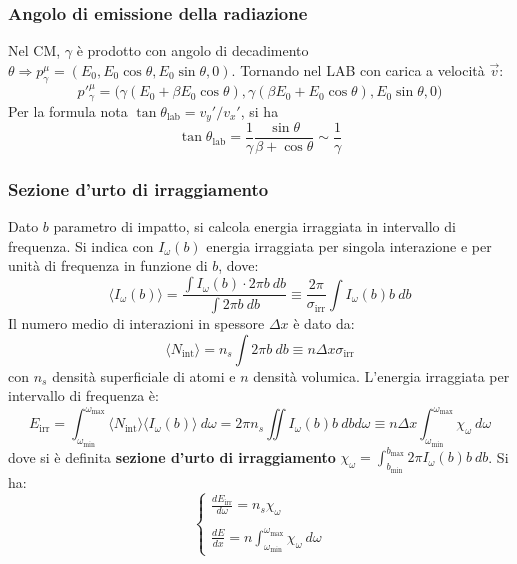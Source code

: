 \documentclass[10pt, a4paper]{scrartcl}
\numberwithin{equation}{subsection}
\theoremstyle{style1}
\begin{document}
\subsubsection{Angolo di emissione della radiazione}
Nel CM, $\gamma$ \`e prodotto con angolo di decadimento $\theta \Rightarrow p^\mu _\gamma = (E_0, E_0 \cos \theta , E_0 \sin \theta ,0)$. Tornando nel LAB con carica a velocit\`a $\vec{v}$: 
\[
 p'^\mu _\gamma = \Big(\gamma(E_0 + \beta E_0\cos\theta ), \gamma (\beta  E_0 + E_0 \cos \theta ), E_0 \sin \theta,0 \Big)
\] 
Per la formula nota $\tan \theta _\text{lab}= v_y' / v_x ' $, si ha
\begin{equation}
	\tan \theta _\text{lab} = \frac{1}{\gamma} \frac{\sin \theta }{\beta  + \cos \theta } \sim \frac{1}{\gamma}
\end{equation}
\subsubsection{Sezione d'urto di irraggiamento}
Dato $b$ parametro di impatto, si calcola energia irraggiata in intervallo di frequenza. Si indica con $I_\omega(b)$ energia irraggiata per singola interazione e per unit\`a di frequenza in funzione di $b$, dove:
\begin{equation}
	\langle I_\omega(b) \rangle = \frac{\displaystyle \int I_\omega(b) \cdot  2\pi  b\ db}{\displaystyle \int 2\pi b \ db}\equiv \frac{2\pi}{\sigma _\text{irr}} \int I_\omega(b) b \ db
\end{equation}
Il numero medio di interazioni in spessore $\Delta x$ \`e dato da:
\begin{equation}
	\langle N_\text{int} \rangle = n_s \int 2\pi b \ db \equiv n\Delta x \sigma _\text{irr}
\end{equation}
con $n_s$ densit\`a superficiale di atomi e $n$ densit\`a volumica. L'energia irraggiata per intervallo di frequenza \`e:
\begin{equation}
	E_\text{irr} = \int_{\omega_\text{min}} ^{\omega_\text{max}} \langle N_\text{int} \rangle \langle I_\omega(b) \rangle \ d\omega = 2\pi n_s \iint I_\omega(b) b \ dbd\omega \equiv n\Delta x \int_{\omega_\text{min}} ^{\omega_\text{max}} \chi _\omega \ d\omega
\end{equation}
dove si \`e definita \textbf{sezione d'urto di irraggiamento} $\chi _\omega = \int_{b_\text{min}} ^{b_\text{max}} 2\pi I_\omega (b) b \ db$. Si ha:
\begin{equation}
	\begin{cases}
		\displaystyle \frac{d E_\text{irr}}{d \omega} = n_s \chi _\omega\\
		\\
		\displaystyle \frac{d E}{d x} = n \int_{\omega_\text{min}} ^{\omega_\text{max}} \chi _\omega \ d\omega
	\end{cases}
\end{equation}
\end{document}
